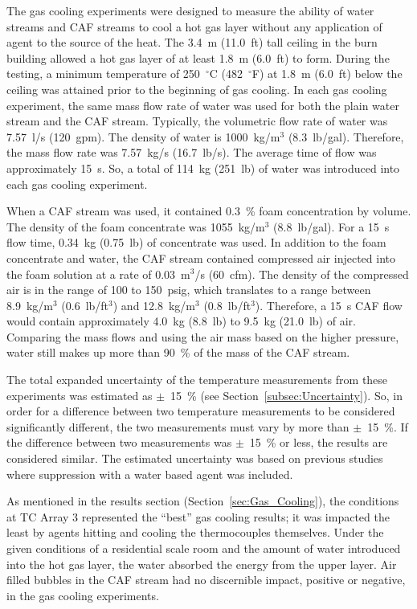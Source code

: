 \documentclass[12pt,oneside]{book}
\begin{document}
The gas cooling experiments were designed to measure the ability of water streams and CAF streams to cool a hot gas layer without any application of agent to the source of the heat. The 3.4~m (11.0~ft) tall ceiling in the burn building allowed a hot gas layer of at least 1.8~m (6.0~ft) to form. During the testing, a minimum temperature of 250~$^{\circ}$C (482~$^{\circ}$F) at 1.8~m (6.0~ft) below the ceiling was attained prior to the beginning of gas cooling. In each gas cooling experiment, the same mass flow rate of water was used for both the plain water stream and the CAF stream. Typically, the volumetric flow rate of water was 7.57~l/s (120~gpm). The density of water is 1000~kg/m$^3$ (8.3~lb/gal). Therefore, the mass flow rate was 7.57~kg/s (16.7~lb/s). The average time of flow was approximately 15~s. So, a total of 114~kg (251~lb) of water was introduced into each gas cooling experiment.

When a CAF stream was used, it contained 0.3~\% foam concentration by volume. The density of the foam concentrate was 1055~kg/m$^3$ (8.8~lb/gal). For a 15~s flow time, 0.34~kg (0.75~lb) of concentrate was used. In addition to the foam concentrate and water, the CAF stream contained compressed air injected into the foam solution at a rate of 0.03~m$^3$/s (60~cfm). The density of the compressed air is in the range of 100 to 150~psig, which translates to a range between 8.9~kg/m$^3$ (0.6~lb/ft$^3$) and 12.8~kg/m$^3$ (0.8~lb/ft$^3$). Therefore, a 15~s CAF flow would contain approximately 4.0~kg (8.8~lb) to 9.5~kg (21.0~lb) of air. Comparing the mass flows and using the air mass based on the higher pressure, water still makes up more than 90~\% of the mass of the CAF stream.

The total expanded uncertainty of the temperature measurements from these experiments was estimated as $\pm$~15~\% (see Section~\ref{subsec:Uncertainty}). So, in order for a difference between two temperature measurements to be considered significantly different, the two measurements must vary by more than $\pm$~15~\%. If the difference between two measurements was $\pm$~15~\% or less, the results are considered similar. The estimated uncertainty was based on previous studies where suppression with a water based agent was included.

As mentioned in the results section (Section~\ref{sec:Gas_Cooling}), the conditions at TC Array 3 represented the ``best'' gas cooling results; it was impacted the least by agents hitting and cooling the thermocouples themselves. Under the given conditions of a residential scale room and the amount of water introduced into the hot gas layer, the water absorbed the energy from the upper layer. Air filled bubbles in the CAF stream had no discernible impact, positive or negative, in the gas cooling experiments.
\end{document}
